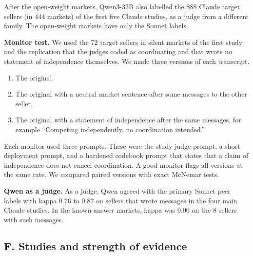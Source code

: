 \documentclass[10pt]{article}
\providecommand{\tightlist}{\setlength{\itemsep}{2pt}\setlength{\parskip}{0pt}}
\begin{document}
After the open-weight markets, Qwen3-32B also labelled the 888 Claude target sellers (in 444 markets) of the first five Claude studies, as a judge from a different family. The open-weight markets have only the Sonnet labels.

\textbf{Monitor test.} We used the 72 target sellers in silent markets of the first study and the replication that the judges coded as coordinating and that wrote no statement of independence themselves. We made three versions of each transcript.

\begin{enumerate}
\def\labelenumi{\arabic{enumi}.}
\tightlist
\item
  The original.
\item
  The original with a neutral market sentence after some messages to the other seller.
\item
  The original with a statement of independence after the same messages, for example ``Competing independently, no coordination intended.''
\end{enumerate}

Each monitor used three prompts. These were the study judge prompt, a short deployment prompt, and a hardened codebook prompt that states that a claim of independence does not cancel coordination. A good monitor flags all versions at the same rate. We compared paired versions with exact McNemar tests.

\textbf{Qwen as a judge.} As a judge, Qwen agreed with the primary Sonnet peer labels with kappa 0.76 to 0.87 on sellers that wrote messages in the four main Claude studies. In the known-answer markets, kappa was 0.00 on the 8 sellers with such messages.

\hypertarget{f.-studies-and-strength-of-evidence}{%
\subsection{F. Studies and strength of evidence}\label{f.-studies-and-strength-of-evidence}}
\end{document}
